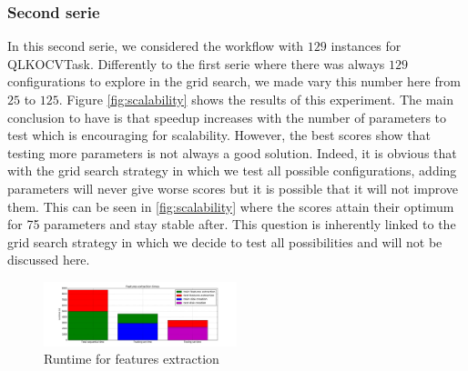 \documentclass[10pt, conference, compsocconf]{IEEEtran}
\begin{document}
\subsubsection{Second serie}

In this second serie, we considered the workflow with $129$ instances for QLKOCVTask. Differently to the first serie where there was 
always $129$ configurations to explore in the grid search, we made vary this number here from $25$ to $125$. 
Figure \ref{fig:scalability} shows the results of this experiment. The main conclusion to have is that speedup increases with the number of parameters to test which is encouraging for scalability. However, the best scores show that testing more parameters is not always a good solution. Indeed, it is obvious that with the grid search strategy in which we test all possible configurations, adding parameters will never give worse scores but it is possible that it will not improve them. This can be seen in \ref{fig:scalability} where the scores attain their optimum for 75 parameters and stay stable after. This question is inherently linked to the grid search strategy in which we decide to test all possibilities and will not be discussed here.

\setlength{\belowcaptionskip}{-6pt}
\setlength{\intextsep}{0pt}
\setlength{\textfloatsep}{1pt}

\begin{figure}
  \centering
  \includegraphics[width=0.5\textwidth]{Figures/times_extraction.png}
  \caption{Runtime for features extraction \label{fig:times_extraction}}
\end{figure}
\end{document}
